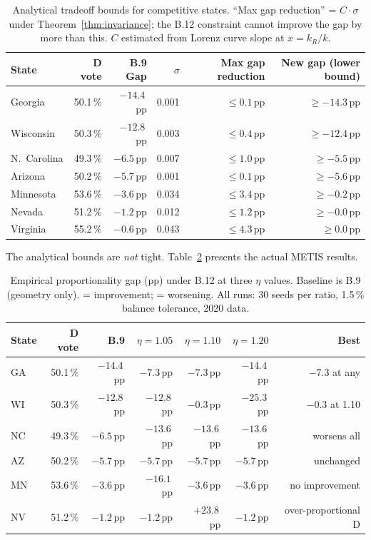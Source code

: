\begin{table}[h]
\centering
\caption{Analytical tradeoff bounds for competitive states.
``Max gap reduction'' = $C \cdot \sigma$ under Theorem~\ref{thm:invariance};
the B.12 constraint cannot improve the gap by more than this.
$C$ estimated from Lorenz curve slope at $x = k_R/k$.}
\label{tab:tradeoff}
\small
\begin{tabular}{lrrrrr}
\toprule
State & D vote & B.9 Gap & $\sigma$ & Max gap reduction & New gap (lower bound) \\
\midrule
Georgia       & 50.1\,\% & $-14.4$\,pp & 0.001 & $\leq 0.1$\,pp & $\geq -14.3$\,pp \\
Wisconsin     & 50.3\,\% & $-12.8$\,pp & 0.003 & $\leq 0.4$\,pp & $\geq -12.4$\,pp \\
N.\ Carolina  & 49.3\,\% &  $-6.5$\,pp & 0.007 & $\leq 1.0$\,pp & $\geq -5.5$\,pp \\
Arizona       & 50.2\,\% &  $-5.7$\,pp & 0.001 & $\leq 0.1$\,pp & $\geq -5.6$\,pp \\
Minnesota     & 53.6\,\% &  $-3.6$\,pp & 0.034 & $\leq 3.4$\,pp & $\geq -0.2$\,pp \\
Nevada        & 51.2\,\% &  $-1.2$\,pp & 0.012 & $\leq 1.2$\,pp & $\geq -0.0$\,pp \\
Virginia      & 55.2\,\% &  $-0.6$\,pp & 0.043 & $\leq 4.3$\,pp & $\geq  0.0$\,pp \\
\bottomrule
\end{tabular}
\end{table}

\noindent The analytical bounds are \emph{not} tight.
Table~\ref{tab:tradeoff-empirical} presents the actual METIS results.

\begin{table}[h]
\centering
\caption{Empirical proportionality gap (pp) under B.12 at three $\eta$ values.
Baseline is B.9 (geometry only). \textuparrow{} = improvement; \textdownarrow{} = worsening.
All runs: 30 seeds per ratio, 1.5\,\% balance tolerance, 2020 data.}
\label{tab:tradeoff-empirical}
\begin{tabular}{lrrrrrr}
\toprule
State & D vote & B.9 & $\eta=1.05$ & $\eta=1.10$ & $\eta=1.20$ & Best \\
\midrule
GA & 50.1\,\% & $-14.4$\,pp & $-7.3$\,pp & $-7.3$\,pp & $-14.4$\,pp & $-7.3$ at any \\
WI & 50.3\,\% & $-12.8$\,pp & $-12.8$\,pp & $-0.3$\,pp & $-25.3$\,pp & $-0.3$ at 1.10 \\
NC & 49.3\,\% & $-6.5$\,pp  & $-13.6$\,pp & $-13.6$\,pp & $-13.6$\,pp & worsens all \\
AZ & 50.2\,\% & $-5.7$\,pp  & $-5.7$\,pp  & $-5.7$\,pp  & $-5.7$\,pp  & unchanged \\
MN & 53.6\,\% & $-3.6$\,pp  & $-16.1$\,pp & $-3.6$\,pp & $-3.6$\,pp & no improvement \\
NV & 51.2\,\% & $-1.2$\,pp  & $-1.2$\,pp  & $+23.8$\,pp & $-1.2$\,pp  & over-proportional D \\
\bottomrule
\end{tabular}
\end{table}

